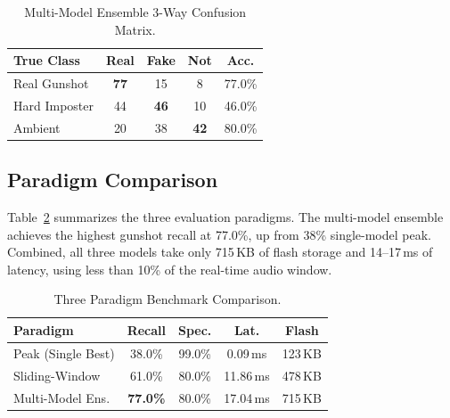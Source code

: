 \documentclass[conference]{IEEEtran}
\begin{document}
\begin{table}[!t]
\centering
\caption{Multi-Model Ensemble 3-Way Confusion Matrix.}
\label{tab:ensemble}
\small
\begin{tabular}{lcccc}
\toprule
\textbf{True Class} & \textbf{Real} & \textbf{Fake} & \textbf{Not} & \textbf{Acc.} \\
\midrule
Real Gunshot & \textbf{77} & 15 & 8 & 77.0\% \\
Hard Imposter & 44 & \textbf{46} & 10 & 46.0\% \\
Ambient & 20 & 38 & \textbf{42} & 80.0\% \\
\bottomrule
\end{tabular}
\end{table}

\subsection{Paradigm Comparison}
Table~\ref{tab:paradigm} summarizes the three evaluation paradigms. The multi-model ensemble achieves the highest gunshot recall at 77.0\%, up from 38\% single-model peak. Combined, all three models take only 715\,KB of flash storage and 14--17\,ms of latency, using less than 10\% of the real-time audio window.

\begin{table}[!t]
\centering
\caption{Three Paradigm Benchmark Comparison.}
\label{tab:paradigm}
\small
\begin{tabular}{lcccc}
\toprule
\textbf{Paradigm} & \textbf{Recall} & \textbf{Spec.} & \textbf{Lat.} & \textbf{Flash} \\
\midrule
Peak (Single Best) & 38.0\% & 99.0\% & 0.09\,ms & 123\,KB \\
Sliding-Window & 61.0\% & 80.0\% & 11.86\,ms & 478\,KB \\
Multi-Model Ens. & \textbf{77.0\%} & 80.0\% & 17.04\,ms & 715\,KB \\
\bottomrule
\end{tabular}
\end{table}

\end{document}
